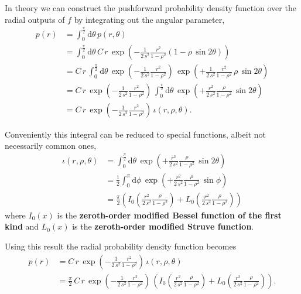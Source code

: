 \documentclass[
  letterpaper,
  DIV=11,
  numbers=noendperiod]{scrartcl}
\begin{document}
In theory we can construct the pushforward probability density function
over the radial outputs of \(f\) by integrating out the angular
parameter, \begin{align*}
p(r)
&=
\int_{0}^{\frac{\pi}{2}} \mathrm{d} \theta \, p(r, \theta)
\\
&=
\int_{0}^{\frac{\pi}{2}} \mathrm{d} \theta \,
C \, r \, \exp \left( - \frac{1}{2 \, s^{2}} \frac{r^{2}}{1 - \rho^{2}}
( 1 - \rho \, \sin 2 \theta)
\right)
\\
&=
C \, r \,
\int_{0}^{\frac{\pi}{2}} \mathrm{d} \theta \,
\exp \left( - \frac{1}{2 \, s^{2}} \frac{r^{2}}{1 - \rho^{2}}
\right) \,
\exp \left( + \frac{1}{2 \, s^{2}} \frac{r^{2}}{1 - \rho^{2}} \,
              \rho \, \sin 2 \theta
\right)
\\
&=
C \, r \,
\exp \left( - \frac{1}{2 \, s^{2}} \frac{r^{2}}{1 - \rho^{2}} \right) \,
\int_{0}^{\frac{\pi}{2}} \mathrm{d} \theta \,
\exp \left( + \frac{r^{2}}{2 \, s^{2}} \frac{\rho}{1 - \rho^{2}} \,
              \sin 2 \theta
\right)
\\
&=
C \, r \,
\exp \left( - \frac{1}{2 \, s^{2}} \frac{r^{2}}{1 - \rho^{2}} \right) \,
\iota(r, \rho, \theta).
\end{align*}

Conveniently this integral can be reduced to special functions, albeit
not necessarily common ones, \begin{align*}
\iota(r, \rho, \theta)
&=
\int_{0}^{\frac{\pi}{2}} \mathrm{d} \theta \,
\exp \left( + \frac{r^{2}}{2 \, s^{2}} \frac{\rho}{1 - \rho^{2}} \,
              \sin 2 \theta
\right)
\\
&=
\frac{1}{2} \int_{0}^{\pi} \mathrm{d} \phi \,
\exp \left( + \frac{r^{2}}{2 \, s^{2}} \frac{\rho}{1 - \rho^{2}} \,
              \sin \phi \right)
\\
&=
\frac{\pi}{2} \left(
  I_{0} \left( \frac{r^{2}}{2 \, s^{2}} \frac{\rho}{1 - \rho^{2}} \right)
+ L_{0} \left( \frac{r^{2}}{2 \, s^{2}} \frac{\rho}{1 - \rho^{2}} \right)
\right)
\end{align*} where \(I_{0}(x)\) is the \textbf{zeroth-order modified
Bessel function of the first kind} and \(L_{0}(x)\) is the
\textbf{zeroth-order modified Struve function}.

Using this result the radial probability density function becomes
\begin{align*}
p(r)
&=
C \, r \,
\exp \left( - \frac{1}{2 \, s^{2}} \frac{r^{2}}{1 - \rho^{2}} \right) \,
\iota(r, \rho, \theta)
\\
&=
\frac{\pi}{2} \, C \, r \,
\exp \left( - \frac{1}{2 \, s^{2}} \frac{r^{2}}{1 - \rho^{2}} \right) \,
\left(
  I_{0} \left( \frac{r^{2}}{2 \, s^{2}} \frac{\rho}{1 - \rho^{2}} \right)
+ L_{0} \left( \frac{r^{2}}{2 \, s^{2}} \frac{\rho}{1 - \rho^{2}} \right)
\right).
\end{align*}
\end{document}
